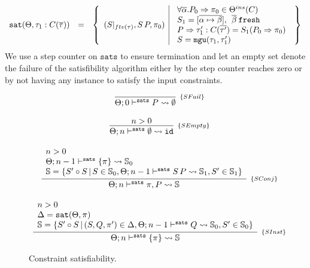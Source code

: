 \documentclass[a4paper, 11pt]{article}
\begin{document}
\[
  \begin{array}{lcl}
    \texttt{sat}(\Theta,\tau_1 : C(\overline{\tau})) & = & \left\{\begin{array}{l|l} 
                                (S|_{ftv(\tau)}, S\,P, \pi_0) & 
                                  \begin{array}{l}
                                    \forall\overline{\alpha} . P_0 \Rightarrow \pi_0 \in \Theta^{ins}(C) \\ 
                                    S_1 = [\overline{\alpha\mapsto\beta}],\:\:\overline{\beta}\:\mathtt{fresh}\\ 
                                    P \Rightarrow \tau'_1 : C(\overline{\tau'}) = S_1(P_0\Rightarrow \pi_0)\\ 
                                    S = \mathtt{mgu}(\tau_1, \tau'_1)\\
                                  \end{array}
                             \end{array}\right\}
  \end{array}
\]
We use a step counter on $\mathtt{sats}$ to ensure termination and let 
an empty set denote the failure of the satisfibility algorithm either 
by the step counter reaches zero or by not having any instance to 
satisfy the input constraints.

\begin{figure}[H] 
  \[
    \begin{array}{c}
      \infer[_{\{SFail\}}]
            {\sats{P}{\emptyset}{0}} 
            {}
      \\ \\ 
      \infer[_{\{SEmpty\}}]
            {\sats{\emptyset}{\id}{n}}
            {n > 0}
      \\ \\ 
      \infer[_{\{SConj\}}]
            {\sats{\pi , P}{\mathbb{S}}{n}} 
            {\begin{array}{l}
              n > 0\\
              \sats{\{\pi\}}{\mathbb{S}_0}{n - 1}\\
              \mathbb{S} = \{S'\circ S\,|\,S \in \mathbb{S}_0, \sats{S\,P}{\mathbb{S}_1}{n - 1}, S' \in \mathbb{S}_1\}
             \end{array}}
      \\ \\ 
      \infer[_{\{SInst\}}] 
            {\sats{\{\pi\}}{\mathbb{S}}{n}}
            {\begin{array}{l}
              n > 0 \\ 
              \Delta = \mathtt{sat}(\Theta,\pi)\\
              \mathbb{S} = \{S'\circ S\,|\,(S,Q,\pi')\in\Delta, \sats{Q}{\mathbb{S}_0}{n - 1}, S' \in \mathbb{S}_0\}
             \end{array}}
    \end{array}
  \]
  \caption{Constraint satisfiability.}
  \label{fig:sat-algorithm}
\end{figure}
\end{document}
